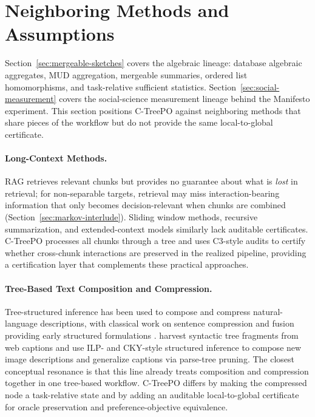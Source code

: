 \section{Neighboring Methods and Assumptions}\label{sec:related}

Section~\ref{sec:mergeable-sketches} covers the algebraic lineage:
database algebraic aggregates, MUD aggregation, mergeable summaries,
ordered list homomorphisms, and task-relative sufficient statistics.
Section~\ref{sec:social-measurement} covers the social-science
measurement lineage behind the Manifesto experiment. This section
positions C-TreePO against neighboring methods that share pieces of the
workflow but do not provide the same local-to-global certificate.

\paragraph{Long-Context Methods.}
RAG retrieves relevant chunks but provides no guarantee about what is
\emph{lost} in retrieval; for non-separable targets, retrieval may miss
interaction-bearing information that only becomes decision-relevant when
chunks are combined (Section~\ref{sec:markov-interlude}). Sliding window
methods, recursive summarization, and extended-context models similarly
lack auditable certificates. C-TreePO processes all chunks through a tree
and uses C3-style audits to certify whether cross-chunk interactions are
preserved in the realized pipeline, providing a certification layer that
complements these practical approaches.

\paragraph{Tree-Based Text Composition and Compression.}
Tree-structured inference has been used to compose and compress
natural-language descriptions, with classical work on sentence
compression and fusion providing early structured formulations
\citep{KnightMarcu2000SentenceCompression,BarzilayMcKeown2005SentenceFusion,ClarkeLapata2008ILPSentenceCompression}.
\citet{KuznetsovaEtAl2014TreeTalk} harvest syntactic tree fragments from
web captions and use ILP- and CKY-style structured inference to compose
new image descriptions and generalize captions via parse-tree pruning.
The closest conceptual resonance is that this line already treats
composition and compression together in one tree-based workflow. C-TreePO
differs by making the compressed node a task-relative state and by adding
an auditable local-to-global certificate for oracle preservation and
preference-objective equivalence.

